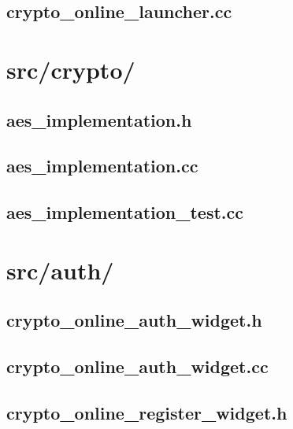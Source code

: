 \subsection{crypto\_online\_launcher.cc}

\newpage


\section{src/crypto/}

\subsection{aes\_implementation.h}

\newpage

\subsection{aes\_implementation.cc}

\newpage

\subsection{aes\_implementation\_test.cc}

\newpage

\section{src/auth/}

\subsection{crypto\_online\_auth\_widget.h}

\newpage

\subsection{crypto\_online\_auth\_widget.cc}

\newpage

\subsection{crypto\_online\_register\_widget.h}

\newpage

